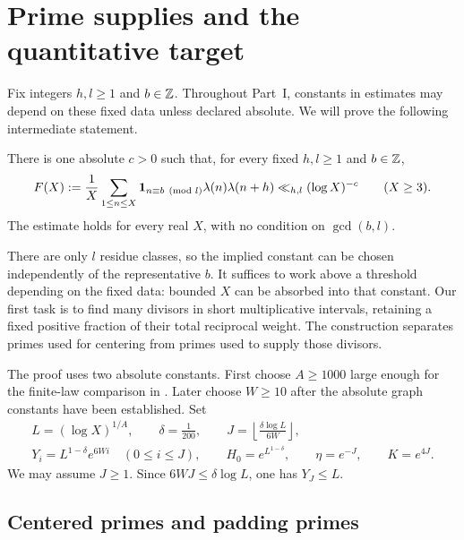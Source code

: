 \section{Prime supplies and the quantitative target}\label{q:setup}

Fix integers \(h,l\ge1\) and \(b\in\mathbb Z\). Throughout Part~I, constants
in estimates may depend on these fixed data unless declared absolute.
We will prove the following intermediate statement.

\begin{proposition}
\label{q:progression}
There is one absolute \(c>0\) such that, for every fixed \(h,l\ge1\)
and \(b\in\mathbb Z\),
\[
 F(X):=\frac1X\sum_{1\le n\le X}
   \mathbf 1_{n\equiv b\pmod l}\lambda(n)\lambda(n+h)
 \ll_{h,l}(\log X)^{-c}\qquad(X\ge3).
\]
The estimate holds for every real \(X\), with no condition on
\(\gcd(b,l)\).
\end{proposition}

There are only \(l\) residue classes, so the implied constant can be
chosen independently of the representative \(b\).
It suffices to work above a threshold depending on the fixed data:
bounded \(X\) can be absorbed into that constant.
Our first task is to find many divisors in short multiplicative intervals,
retaining a fixed positive fraction of their total reciprocal weight.
The construction separates primes used for centering from primes used
to supply those divisors.

The proof uses two absolute constants. First choose \(A\ge1000\)
large enough for the finite-law comparison in
. Later choose \(W\ge10\) after the absolute
graph constants have been established. Set
\begin{equation}\label{q:parameters}
 \begin{gathered}
 L=(\log X)^{1/A},\qquad \delta=\frac1{200},\qquad
 J=\left\lfloor\frac{\delta\log L}{6W}\right\rfloor,\\
 Y_i=L^{1-\delta}e^{6Wi}\quad(0\le i\le J),\qquad
 H_0=e^{L^{1-\delta}},\qquad
 \eta=e^{-J},\qquad K=e^{4J}.
 \end{gathered}
\end{equation}
We may assume \(J\ge1\). Since \(6WJ\le\delta\log L\), one has
\(Y_J\le L\).

\subsection{Centered primes and padding primes}

